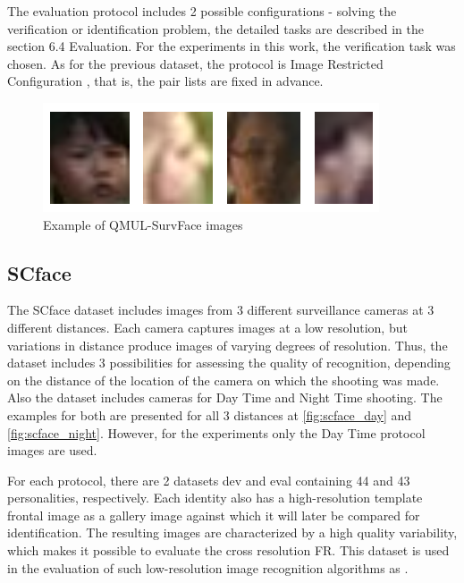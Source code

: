 \documentclass[11pt,a4paper]{article}
\begin{document}
The evaluation protocol includes 2 possible configurations - solving the verification or identification problem, the detailed tasks are described in the section 6.4 Evaluation. For the experiments in this work, the verification task was chosen. As for the previous dataset, the protocol is Image Restricted Configuration \cite{lfw}, that is, the pair lists are fixed in advance. 

\begin{figure}[ht!]
    \centering
    \includegraphics[width=\textwidth]{qmul.png}
    \caption{Example of QMUL-SurvFace images}
    \label{fig:qmul}
\end{figure}

\subsection{SCface}
The SCface \cite{scface} dataset includes images from 3 different surveillance cameras at 3 different distances. Each camera captures images at a low resolution, but variations in  distance produce images of varying degrees of resolution. Thus, the dataset includes 3 possibilities for assessing the quality of recognition, depending on the distance of the location of the camera on which the shooting was made. Also the dataset includes cameras for Day Time and Night Time shooting. The examples for both are presented for all 3 distances at \ref{fig:scface_day} and \ref{fig:scface_night}. However, for the experiments only the Day Time protocol images are used. 

For each protocol, there are 2 datasets dev and eval containing 44 and 43 personalities, respectively. Each identity also has a high-resolution template frontal image as a gallery image against which it will later be compared for identification. The resulting images are characterized by a high quality variability, which makes it possible to evaluate the cross resolution  FR. This dataset is used in the evaluation of such low-resolution image recognition algorithms as \cite{25}.
\end{document}
